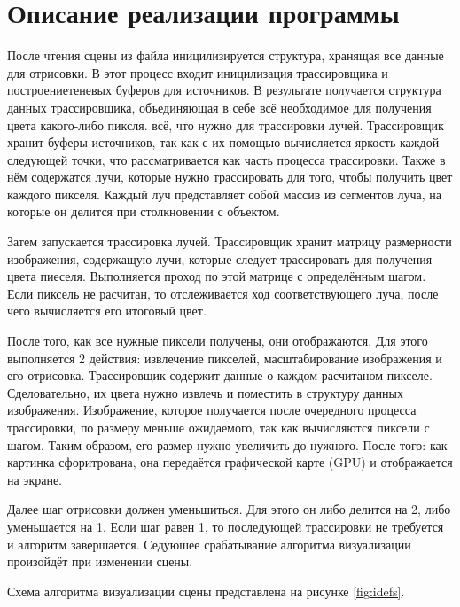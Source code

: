 \section{Описание реализации программы} {
    После чтения сцены из файла иницилизируется структура,
    хранящая все данные для отрисовки.
    В этот процесс входит иницилизация трассировщика
    и построениетеневых буферов для источников.
    В результате получается структура данных трассировщика,
    объединяющая в себе всё необходимое для получения цвета какого-либо пиксля.
    всё, что нужно для трассировки лучей.
    Трассировщик хранит буферы источников, так как с их помощью вычисляется
    яркость каждой следующей точки, что рассматривается как часть процесса
    трассировки.
    Также в нём содержатся лучи, которые нужно трассировать для того, чтобы
    получить цвет каждого пикселя.
    Каждый луч представляет собой массив из сегментов луча, на которые
    он делится при столкновении с объектом.
    
    Затем запускается трассировка лучей.
    Трассировщик хранит матрицу размерности изображения, содержащую
    лучи, которые следует трассировать для получения цвета пиеселя.
    Выполняется проход по этой матрице с определённым шагом.
    Если пиксель не расчитан, то отслеживается ход соответствующего луча,
    после чего вычисляется его итоговый цвет.

    После того, как все нужные пиксели получены, они отображаются.
    Для этого выполняется 2 действия: извлечение пикселей,
    масштабирование изображения и его отрисовка.
    Трассировщик содержит данные о каждом расчитаном пикселе.
    Сделовательно, их цвета нужно извлечь и поместить в
    структуру данных изображения.
    Изображение, которое получается после очередного процесса трассировки,
    по размеру меньше ожидаемого, так как вычисляются пиксели с шагом.
    Таким образом, его размер нужно увеличить до нужного.
    После того: как картинка сфоритрована, она передаётся
    графической карте (GPU) и отображается на экране.

    Далее шаг отрисовки должен уменьшиться.
    Для этого он либо делится на 2, либо уменьшается на 1.
    Если шаг равен 1, то последующей трассировки не требуется
    и алгоритм завершается.
    Седуюшее срабатывание алгоритма визуализации произойдёт
    при изменении сцены.
    
    Схема алгоритма визуализации сцены представлена на рисунке \ref{fig:idefs}.

}
